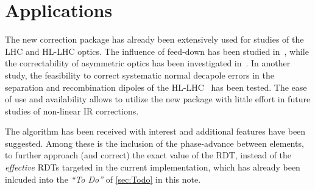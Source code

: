 \section{Applications}

The new correction package has already been extensively used for studies of the LHC and HL-LHC optics.
The influence of feed-down has been studied in~\cite{DillyCorrectionsFeedDownNonLinear2021},
while  the  correctability  of asymmetric optics has been investigated in~\cite{DillyCorrectionsAsymmetricNonLinear2021}.
In another study, the feasibility to correct systematic normal decapole errors in the separation and 
recombination dipoles of the HL-LHC~\cite{DillyFeasibilityCorrectingSystematic2021,DillyCorrectionsSystematicNormal2022} has been tested.
The ease of use and availability allows to utilize the new package with little effort in future studies of non-linear IR corrections.

The algorithm has been received with interest and additional features have been suggested.
Among these is the inclusion of the phase-advance between elements, 
to further approach (and correct) the exact value of the RDT, 
instead of the \textit{effective} RDTs targeted in the current implementation, which has already been inlcuded into the \textit{``To Do''} of \cref{sec:Todo} in this note.

